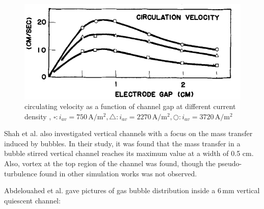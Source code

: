 \begin{figure}[H]
    \centering
    \includegraphics[scale=0.7]{circulatingvelocity.png}
    \caption{circulating velocity as a function of channel gap at different current density \cite{Hine1980}, $\square:i_{av}=750\, \mathrm{A/m^2}, \triangle: i_{av}=2270\, \mathrm{A/m^2},\bigcirc:i_{av}=3720\, \mathrm{A/m^2}$ }
    \label{circulatingvelocity}
\end{figure}


Shah et al. \cite{Jorne1989} also investigated vertical channels with a focus on the mass transfer induced by bubbles. In their study, it was found that the mass transfer in a bubble stirred vertical channel reaches its maximum value at a width of 0.5 cm. Also, vortex at the top region of the channel was found, though the pseudo-turbulence found in other simulation works was not observed.

Abdelouahed et al.\cite{abdelouahed2014hydrodynamics} gave pictures of gas bubble distribution inside a $6 \, \mathrm{mm}$ vertical quiescent channel:




